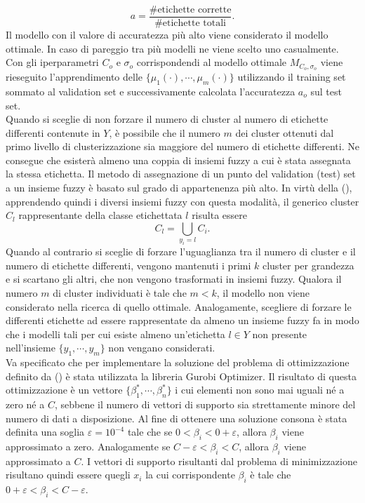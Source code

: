 \documentclass [11pt,a4paper,twoside,openright] {book}
\begin{document}
\begin{equation}
a = \dfrac{\text{\# etichette corrette}}{\text{\# etichette totali}}.
\end{equation}Il modello con il valore di accuratezza più alto viene considerato il modello ottimale. In caso di pareggio tra più modelli ne viene scelto uno casualmente.
Con gli iperparametri $C_o$ e $\sigma_o$ corrispondendi al modello ottimale $M_{C_o, \sigma_o}$ viene rieseguito l'apprendimento delle $\lbrace \mu_1(\cdot), \cdots, \mu_m(\cdot) \rbrace$ utilizzando il training set sommato al validation set e successivamente calcolata l'accuratezza $a_o$ sul test set.\\
Quando si sceglie di non forzare il numero di cluster al numero di etichette differenti contenute in $Y$, è possibile che il numero $m$ dei cluster ottenuti dal primo livello di clusterizzazione sia maggiore del numero di etichette differenti. Ne consegue che esisterà almeno una coppia di insiemi fuzzy a cui è stata assegnata la stessa etichetta. Il metodo di assegnazione di un punto del validation (test) set a un insieme fuzzy è basato sul grado di appartenenza più alto. In virtù della (), apprendendo quindi i diversi insiemi fuzzy con questa modalità, il generico cluster $C_l$ rappresentante della classe etichettata $l$ risulta essere
\begin{equation}
C_l = \bigcup_{y_i = l} C_i.
\end{equation}
Quando al contrario si sceglie di forzare l'uguaglianza tra il numero di cluster e il numero di etichette differenti, vengono mantenuti i primi $k$ cluster per grandezza e si scartano gli altri, che non vengono trasformati in insiemi fuzzy. Qualora il numero $m$ di cluster individuati è tale che $m<k$, il modello non viene considerato nella ricerca di quello ottimale. Analogamente, scegliere di forzare le differenti etichette ad essere rappresentate da almeno un insieme fuzzy fa in modo che i modelli tali per cui esiste almeno un'etichetta $l \in Y$ non presente nell'insieme $\lbrace y_1, \cdots, y_m \rbrace$ non vengano considerati.\\
Va specificato che per implementare la soluzione del problema di ottimizzazione definito da () è stata utilizzata la libreria Gurobi Optimizer\cite{optimization2014inc}. Il risultato di questa ottimizzazione è un vettore $\lbrace \beta_1^*, \cdots, \beta_n^* \rbrace$ i cui elementi non sono mai uguali né a zero né a $C$, sebbene il numero di vettori di supporto sia strettamente minore del numero di dati a disposizione. Al fine di ottenere una soluzione consona è stata definita una soglia $\varepsilon = 10^{-4}$ tale che se $0 < \beta_i < 0 + \varepsilon$, allora $\beta_i$ viene approssimato a zero. Analogamente se $C - \varepsilon < \beta_i < C$, allora $\beta_i$ viene approssimato a $C$. I vettori di supporto risultanti dal problema di minimizzazione risultano quindi essere quegli $x_i$ la cui corrispondente $\beta_i$ è tale  che $0 + \varepsilon < \beta_i < C -\varepsilon$.
\end{document}
